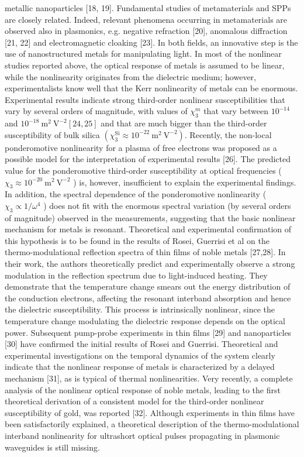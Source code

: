 \documentclass[10pt]{article}
\begin{document}
metallic nanoparticles [18, 19]. Fundamental studies of metamaterials and SPPs are closely related. Indeed, relevant phenomena occurring in metamaterials are observed also in plasmonics, e.g. negative refraction [20], anomalous diffraction [21, 22] and electromagnetic cloaking [23]. In both fields, an innovative step is the use of nanostructured metals for manipulating light. In most of the nonlinear studies reported above, the optical response of metals is assumed to be linear, while the nonlinearity originates from the dielectric medium; however, experimentalists know well that the Kerr nonlinearity of metals can be enormous. Experimental results indicate strong third-order nonlinear susceptibilities that vary by several orders of magnitude, with values of $\chi_{3}^{m}$ that vary between $10^{-14}$ and $10^{-18} \mathrm{~m}^{2} \mathrm{~V}^{-2}[24,25]$ and that are much bigger than the third-order susceptibility of bulk silica $\left(\chi_{3}^{\mathrm{Si}} \approx 10^{-22} \mathrm{~m}^{2} \mathrm{~V}^{-2}\right)$. Recently, the non-local ponderomotive nonlinearity for a plasma of free electrons was proposed as a possible model for the interpretation of experimental results [26]. The predicted value for the ponderomotive third-order susceptibility at optical frequencies ( $\chi_{3} \approx 10^{-20} \mathrm{~m}^{2} \mathrm{~V}^{-2}$ ) is, however, insufficient to explain the experimental findings. In addition, the spectral dependence of the ponderomotive nonlinearity ( $\chi_{3} \propto 1 / \omega^{4}$ ) does not fit with the enormous spectral variation (by several orders of magnitude) observed in the measurements, suggesting that the basic nonlinear mechanism for metals is resonant. Theoretical and experimental confirmation of this hypothesis is to be found in the results of Rosei, Guerrisi et al on the thermo-modulational reflection spectra of thin films of noble metals [27,28]. In their work, the authors theoretically predict and experimentally observe a strong modulation in the reflection spectrum due to light-induced heating. They demonstrate that the temperature change smears out the energy distribution of the conduction electrons, affecting the resonant interband absorption and hence the dielectric susceptibility. This process is intrinsically nonlinear, since the temperature change modulating the dielectric response depends on the optical power. Subsequent pump-probe experiments in thin films [29] and nanoparticles [30] have confirmed the initial results of Rosei and Guerrisi. Theoretical and experimental investigations on the temporal dynamics of the system clearly indicate that the nonlinear response of metals is characterized by a delayed mechanism [31], as is typical of thermal nonlinearities. Very recently, a complete analysis of the nonlinear optical response of noble metals, leading to the first theoretical derivation of a consistent model for the third-order nonlinear susceptibility of gold, was reported [32]. Although experiments in thin films have been satisfactorily explained, a theoretical description of the thermo-modulational interband nonlinearity for ultrashort optical pulses propagating in plasmonic waveguides is still missing.
\end{document}
